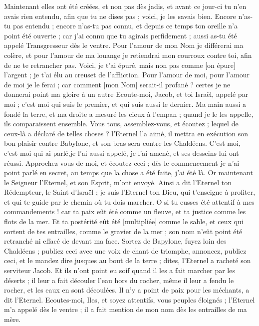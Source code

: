 \begin{multicols}{2}
Maintenant elles ont été créées, et non pas dès jadis, et avant ce jour-ci tu n'en avais rien entendu, afin que tu ne dises pas ; voici, je les savais bien.
Encore n'as-tu pas entendu ; encore n'as-tu pas connu, et depuis ce temps ton oreille n'a point été ouverte ; car j'ai connu que tu agirais perfidement ; aussi as-tu été appelé Transgresseur dès le ventre.
Pour l'amour de mon Nom je différerai ma colère, et pour l'amour de ma louange je retiendrai mon courroux contre toi, afin de ne te retrancher pas.
Voici, je t'ai épuré, mais non pas comme [on épure] l'argent ; je t'ai élu au creuset de l'affliction.
Pour l'amour de moi, pour l'amour de moi je le ferai ; car comment [mon Nom] serait-il profané ? certes je ne donnerai point ma gloire à un autre
Ecoute-moi, Jacob, et toi Israël, appelé par moi ; c'est moi qui suis le premier, et qui suis aussi le dernier.
Ma main aussi a fondé la terre, et ma droite a mesuré les cieux à l'empan ; quand je le les appelle, ils comparaissent ensemble.
Vous tous, assemblez-vous, et écoutez ; lequel de ceux-là a déclaré de telles choses ? l'Eternel l'a aimé, il mettra en exécution son bon plaisir contre Babylone, et son bras sera contre les Chaldéens.
C'est moi, c'est moi qui ai parlé,je l'ai aussi appelé, je l'ai amené, et ses desseins lui ont réussi.
Approchez-vous de moi, et écoutez ceci ; dès le commencement je n'ai point parlé en secret, au temps que la chose a été faite, j'ai été là. Or maintenant le Seigneur l'Eternel, et son Esprit, m'ont envoyé.
Ainsi a dit l'Eternel ton Rédempteur, le Saint d'Israël ; je suis l'Eternel ton Dieu, qui t'enseigne à profiter, et qui te guide par le chemin où tu dois marcher.
O si tu eusses été attentif à mes commandements ! car ta paix eût été comme un fleuve, et ta justice comme les flots de la mer.
Et ta postérité eût été [multipliée] comme le sable, et ceux qui sortent de tes entrailles, comme le gravier de la mer ; son nom n'eût point été retranché ni effacé de devant ma face.
Sortez de Bapylone, fuyez loin des Chaldéens ; publiez ceci avec une voix de chant de triomphe, annoncez, publiez ceci, et le mandez dire jusques au bout de la terre ; dites, l'Eternel a racheté son serviteur Jacob.
Et ils n'ont point eu soif quand il les a fait marcher par les déserts ; il leur a fait découler l'eau hors du rocher, même il leur a fendu le rocher, et les eaux en sont découlées.
Il n'y a point de paix pour les méchants, a dit l'Eternel.
\VerseOne{}Ecoutes-moi, Iles, et soyez attentifs, vous peuples éloignés ; l'Eternel m'a appelé dès le ventre ; il a fait mention de mon nom dès les entrailles de ma mère.

\end{multicols}
